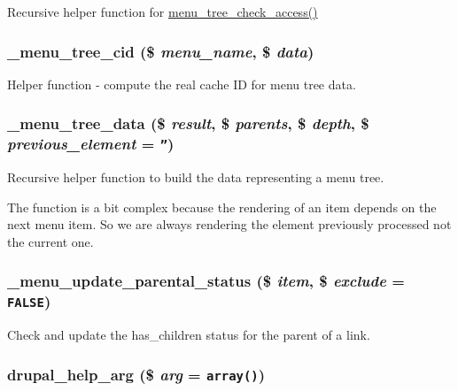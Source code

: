 Recursive helper function for \hyperlink{group__menu_g6374db210d96026fb70431def083a7a5}{menu\_\-tree\_\-check\_\-access()} \hypertarget{group__menu_g165ee791b785630b578b0f737812b8b7}{
\subsubsection[{\_\-menu\_\-tree\_\-cid}]{\setlength{\rightskip}{0pt plus 5cm}\_\-menu\_\-tree\_\-cid (\$ {\em menu\_\-name}, \/  \$ {\em data})}}
\label{group__menu_g165ee791b785630b578b0f737812b8b7}


Helper function - compute the real cache ID for menu tree data. \hypertarget{group__menu_g70d13ba2c42c6b0da4b0ef68bcc7ed0d}{
\subsubsection[{\_\-menu\_\-tree\_\-data}]{\setlength{\rightskip}{0pt plus 5cm}\_\-menu\_\-tree\_\-data (\$ {\em result}, \/  \$ {\em parents}, \/  \$ {\em depth}, \/  \$ {\em previous\_\-element} = {\tt ''})}}
\label{group__menu_g70d13ba2c42c6b0da4b0ef68bcc7ed0d}


Recursive helper function to build the data representing a menu tree.

The function is a bit complex because the rendering of an item depends on the next menu item. So we are always rendering the element previously processed not the current one. \hypertarget{group__menu_g9df6c2183ab9ee0e934eec54a67761d8}{
\subsubsection[{\_\-menu\_\-update\_\-parental\_\-status}]{\setlength{\rightskip}{0pt plus 5cm}\_\-menu\_\-update\_\-parental\_\-status (\$ {\em item}, \/  \$ {\em exclude} = {\tt FALSE})}}
\label{group__menu_g9df6c2183ab9ee0e934eec54a67761d8}


Check and update the has\_\-children status for the parent of a link. \hypertarget{group__menu_g00dce79e81030a75c94c7a279794b253}{
\subsubsection[{drupal\_\-help\_\-arg}]{\setlength{\rightskip}{0pt plus 5cm}drupal\_\-help\_\-arg (\$ {\em arg} = {\tt array()})}}
\label{group__menu_g00dce79e81030a75c94c7a279794b253}


